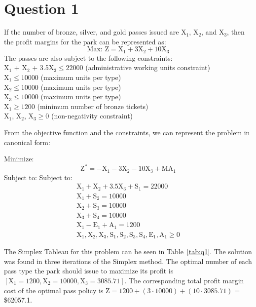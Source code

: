 \section*{Question 1}
If the number of bronze, silver, and gold passes issued are X$_1$, X$_2$, and X$_3$, then the profit margins for the park can be represented as:
\begin{equation*}
	\text{Max: } \text{Z} = \text{X}_1 + 3\text{X}_2 + 10\text{X}_3
\end{equation*}
The passes are also subject to the following constraints:\\
X$_1$ + X$_2$ + 3.5X$_3 \leq 22000$ (administrative working units constraint)\\
X$_1 \leq 10000$ (maximum units per type)\\
X$_2 \leq 10000$ (maximum units per type)\\
X$_3 \leq 10000$ (maximum units per type)\\
X$_1 \geq 1200$ (minimum number of bronze tickets)\\
X$_1$, X$_2$, X$_3 \geq 0$ (non-negativity constraint)

From the objective function and the constraints, we can represent the problem in canonical form:

Minimize:
\begin{equation*}
	\text{Z}^* = -\text{X}_1 - 3\text{X}_2 - 10\text{X}_3 + \text{MA}_1
\end{equation*}
Subject to:
Subject to:
\begin{gather*}
	\text{X}_1 + \text{X}_2 + 3.5\text{X}_3 + \text{S}_1 = 22000 \\
	\text{X}_1 + \text{S}_2 = 10000 \\
	\text{X}_2 + \text{S}_3 = 10000 \\
	\text{X}_3 + \text{S}_4 = 10000 \\
	\text{X}_1 - \text{E}_1 + \text{A}_1 = 1200 \\
	\text{X}_1, \text{X}_2, \text{X}_3, \text{S}_1, \text{S}_2, \text{S}_3, \text{S}_4, \text{E}_1, \text{A}_1 \geq 0
\end{gather*}

The Simplex Tableau for this problem can be seen in Table~\ref{tab:q1}. The solution was found in three iterations of the Simplex method. The optimal number of each pass type the park should issue to maximize its profit is $[\text{X}_1 = 1200, \text{X}_2 = 10000, \text{X}_3 = 3085.71]$. The corresponding total profit margin cost of the optimal pass policy is $\text{Z} = 1200 + (3 \cdot 10000) + (10 \cdot 3085.71) =$ \$62057.1.

